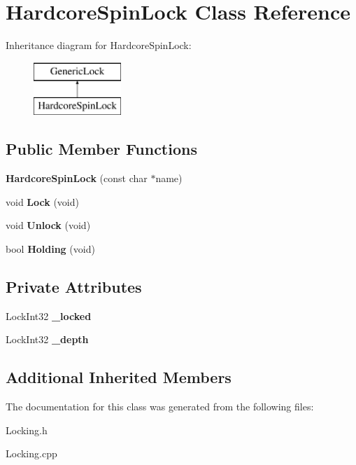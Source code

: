 \hypertarget{class_hardcore_spin_lock}{}\section{Hardcore\+Spin\+Lock Class Reference}
\label{class_hardcore_spin_lock}
Inheritance diagram for Hardcore\+Spin\+Lock\+:\begin{figure}[H]
\begin{center}
\leavevmode
\includegraphics[height=2.000000cm]{class_hardcore_spin_lock}
\end{center}
\end{figure}
\subsection*{Public Member Functions}
\begin{DoxyCompactItemize}
\item 
\mbox{\label{class_hardcore_spin_lock_aa185fc065ed475cca1663304ca913c8a}} 
{\bfseries Hardcore\+Spin\+Lock} (const char $\ast$name)
\item 
\mbox{\label{class_hardcore_spin_lock_a356eced86b643ed8005f7a444b1c08c0}} 
void {\bfseries Lock} (void)
\item 
\mbox{\label{class_hardcore_spin_lock_a8247ac0425a17d728be8f56d740dcd08}} 
void {\bfseries Unlock} (void)
\item 
\mbox{\label{class_hardcore_spin_lock_a81c726f719670690bd1e39785747c979}} 
bool {\bfseries Holding} (void)
\end{DoxyCompactItemize}
\subsection*{Private Attributes}
\begin{DoxyCompactItemize}
\item 
\mbox{\label{class_hardcore_spin_lock_a9a65b2f64f0b2f2c38488f7643614616}} 
Lock\+Int32 {\bfseries \+\_\+locked}
\item 
\mbox{\label{class_hardcore_spin_lock_ae31bccb7b29faa3972e560fe91e947ec}} 
Lock\+Int32 {\bfseries \+\_\+depth}
\end{DoxyCompactItemize}
\subsection*{Additional Inherited Members}


The documentation for this class was generated from the following files\+:\begin{DoxyCompactItemize}
\item 
Locking.\+h\item 
Locking.\+cpp\end{DoxyCompactItemize}
